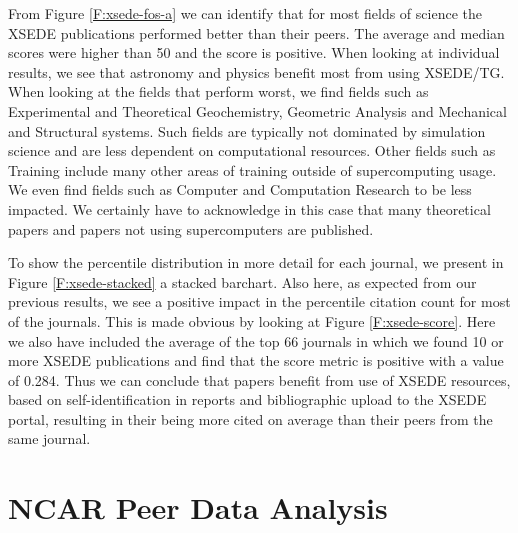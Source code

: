 \documentclass[10pt, conference, compsocconf]{IEEEtran}
\begin{document}
From Figure \ref{F:xsede-fos-a} we can identify that for most fields of science the XSEDE publications performed better than their peers. The average and median scores were higher than 50 and the score is positive. When looking at individual results, we see that astronomy and physics benefit most from using XSEDE/TG. When looking at the fields that perform worst, we find fields such as Experimental and Theoretical Geochemistry, Geometric Analysis and Mechanical and Structural systems. Such fields are typically not dominated by simulation science and are less dependent on computational resources. Other fields such as Training include many other areas of training outside of supercomputing usage. We even find fields such as Computer and Computation Research to be less impacted. We certainly have to acknowledge in this case that many theoretical papers and papers not using supercomputers are published. 

To show the percentile distribution in more detail for each journal, we present in Figure \ref{F:xsede-stacked} a stacked barchart. Also here, as expected from our previous results, we see a positive impact in the percentile citation count for most of the journals. This is made obvious by looking at Figure \ref{F:xsede-score}. Here we also have included the average of the top 66 journals in which we found 10 or more XSEDE publications and find that the score metric is positive with a value of 0.284. Thus we can conclude that papers benefit from use of XSEDE resources, based on self-identification in reports and bibliographic upload to the XSEDE portal, resulting in their being more cited on average than their peers from the same journal.



\section{NCAR Peer Data Analysis}\label{S:ncar}
\end{document}
